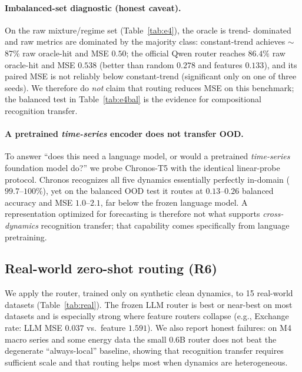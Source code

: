 \documentclass{article}
\begin{document}
\paragraph{Imbalanced-set diagnostic (honest caveat).}
On the raw mixture/regime set (Table~\ref{tab:e4}), the oracle is trend-
dominated and raw metrics are dominated by the majority class: constant-trend
achieves $\sim$87\% raw oracle-hit and MSE $0.50$; the official Qwen router
reaches $86.4\%$ raw oracle-hit and MSE $0.538$ (better than random $0.278$ and
features $0.133$), and its paired MSE is not reliably below constant-trend
(significant only on one of three seeds).  We therefore do \emph{not} claim
that routing reduces MSE on this benchmark; the balanced test in
Table~\ref{tab:e4bal} is the evidence for compositional recognition transfer.

\paragraph{A pretrained \emph{time-series} encoder does not transfer OOD.}
To answer ``does this need a language model, or would a pretrained
\emph{time-series} foundation model do?'' we probe Chronos-T5
\citep{ansari2024chronos} with the identical linear-probe protocol.  Chronos
recognizes all five dynamics essentially perfectly in-domain ($99.7$--$100\%$),
yet on the balanced OOD test it routes at $0.13$--$0.26$ balanced accuracy and
MSE $1.0$--$2.1$, far below the frozen language model.  A representation
optimized for forecasting is therefore not what supports \emph{cross-dynamics}
recognition transfer; that capability comes specifically from language
pretraining.

\subsection{Real-world zero-shot routing (R6)}
We apply the router, trained only on synthetic clean dynamics, to 15 real-world
datasets (Table~\ref{tab:real}).  The frozen LLM router is best or near-best on
most datasets and is especially strong where feature routers collapse (e.g.,
Exchange rate: LLM MSE $0.037$ vs.\ feature $1.591$).  We also report honest
failures: on M4 macro series and some energy data the small $0.6$B router does
not beat the degenerate ``always-local'' baseline, showing that recognition
transfer requires sufficient scale and that routing helps most when dynamics
are heterogeneous.
\end{document}
